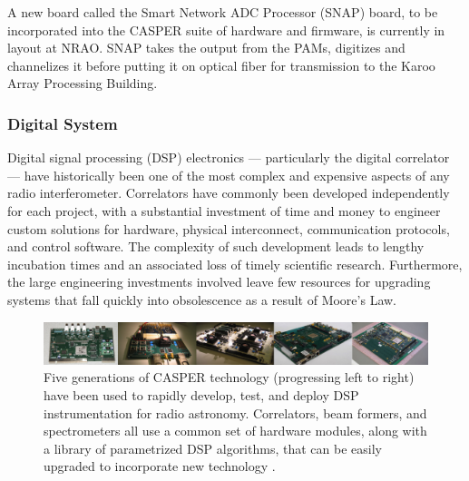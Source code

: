 \documentclass[preprint]{aastex}
\begin{document}
A new board called the Smart Network ADC Processor (SNAP) board, to be incorporated 
into the CASPER suite of hardware and firmware, is currently in layout at NRAO.  SNAP
takes the output from the PAMs, digitizes and channelizes it before putting it on optical fiber
for transmission to the Karoo Array Processing Building.



\subsubsection{Digital System}

Digital signal processing (DSP) electronics --- particularly the digital correlator ---
have historically been one of the most complex and expensive aspects of any radio interferometer.
Correlators have commonly been
developed independently for each project, with a substantial investment
of time and money to engineer
custom solutions for hardware, physical interconnect,
communication protocols, and control software. The complexity of such development
leads to lengthy incubation times and an
associated loss of timely scientific research. Furthermore, the large
engineering investments involved leave few resources
for upgrading systems that fall quickly into obsolescence as a result
of Moore's Law.

\begin{figure}[!ht]\centering
\includegraphics[width=6.5in]{plots/casper_boards.jpg}
\caption{\small
Five generations of CASPER technology (progressing left to right) have been used to rapidly
develop, test, and deploy DSP instrumentation for radio astronomy.  Correlators,
beam formers, and spectrometers all use a common set of hardware modules, along with a library
of parametrized DSP algorithms, that can be easily upgraded to incorporate new technology
\citep{parsons_et_al2006,parsons_et_al2008}.
}\label{fig:casper_boards}
\end{figure}
\end{document}
